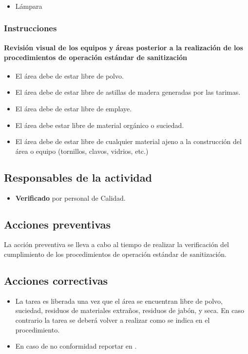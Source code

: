 \begin{itemize}
	\item Lámpara
\end{itemize}

\subsubsection{Instrucciones}
\paragraph{Revisión visual de los equipos y áreas posterior a la realización de los procedimientos de operación estándar de sanitización}
\begin{itemize}
	\item El área debe de estar libre de polvo.
	\item El área debe de estar libre de astillas de madera generadas por las tarimas.
	\item El área debe de estar libre de emplaye.
	\item El área debe estar libre de material orgánico o suciedad.
	\item El área debe de estar libre de cualquier material ajeno a la construcción del área o equipo (tornillos, clavos, vidrios, etc.)
\end{itemize}

\subsection{Responsables de la actividad}
\begin{itemize}
	\item \textbf{Verificado} por personal de Calidad.
\end{itemize}

\subsection{Acciones preventivas}
La acción preventiva se lleva a cabo al tiempo de realizar la verificación del cumplimiento de los procedimientos de operación estándar de sanitización.

\subsection{Acciones correctivas}
\begin{itemize}
	\item La tarea es liberada una vez que el área se encuentran libre de polvo, suciedad, residuos de materiales extraños, residuos de jabón, y seca. En caso contrario la tarea se deberá volver a realizar como se indica en el procedimiento.
	\item En caso de no conformidad reportar en \RAC.
\end{itemize}

